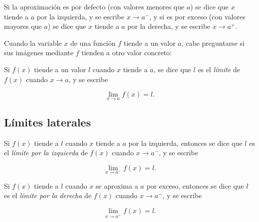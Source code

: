 \documentclass[
  a4paper,
]{scrreport}
\theoremstyle{plain}
\theoremstyle{plain}
\theoremstyle{definition}
\theoremstyle{plain}
\theoremstyle{definition}
\theoremstyle{remark}
\begin{document}
Si la aproximación es por defecto (con valores menores que \(a\)) se
dice que \(x\) tiende a \(a\) por la izquierda, y se escribe
\(x\to a^-\), y si es por exceso (con valores mayores que \(a\)) se dice
que \(x\) tiende a \(a\) por la derecha, y se escribe \(x\to a^+\).

Cuando la variable \(x\) de una función \(f\) tiende a un valor \(a\),
cabe preguntarse si sus imágenes mediante \(f\) tienden a otro valor
concreto:

Si \(f(x)\) tiende a un valor \(l\) cuando \(x\) tiende a \(a\), se dice
que \(l\) es el \emph{límite} de \(f(x)\) cuando \(x\to a\), y se
escribe

\[\lim_{x\to a}f(x)=l.\]

\hypertarget{luxedmites-laterales}{%
\subsection{Límites laterales}\label{luxedmites-laterales}}

Si \(f(x)\) tiende a \(l\) cuando \(x\) tiende a \(a\) por la izquierda,
entonces se dice que \(l\) es el \emph{límite por la izquierda} de
\(f(x)\) cuando \(x\to a^-\), y se escribe

\[\lim_{x\to a^-}f(x)=l.\]

Si \(f(x)\) tiende a \(l\) cuando \(x\) se aproxima a \(a\) por exceso,
entonces se dice que \(l\) es el \emph{límite por la derecha} de
\(f(x)\) cuando \(x\to a^-\), y se escribe

\[\lim_{x\to a^+}f(x)=l.\]
\end{document}
